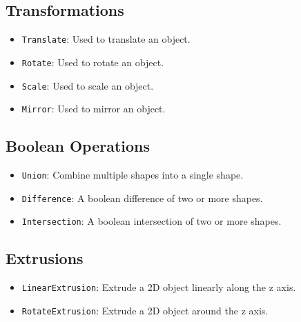 \subsection*{Transformations}

\begin{itemize}
	\item \texttt{Translate}: Used to translate an object.
	\item \texttt{Rotate}: Used to rotate an object.
	\item \texttt{Scale}: Used to scale an object.
	\item \texttt{Mirror}: Used to mirror an object.
\end{itemize}

\subsection*{Boolean Operations}

\begin{itemize}
	\item \texttt{Union}: Combine multiple shapes into a single shape.
	\item \texttt{Difference}: A boolean difference of two or more shapes.
	\item \texttt{Intersection}: A boolean intersection of two or more shapes.
\end{itemize}

\subsection*{Extrusions}

\begin{itemize}
	\item \texttt{LinearExtrusion}: Extrude a 2D object linearly along the z axis.
	\item \texttt{RotateExtrusion}: Extrude a 2D object around the z axis. 
\end{itemize}


